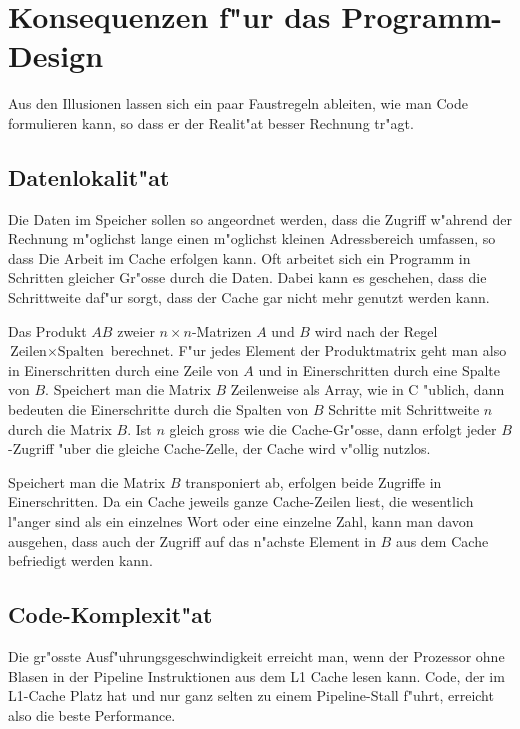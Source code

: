 \section{Konsequenzen f"ur das Programm-Design}
Aus den Illusionen lassen sich ein paar Faustregeln ableiten, wie man
Code formulieren kann, so dass er der Realit"at besser Rechnung tr"agt.

\subsection{Datenlokalit"at}
Die Daten im Speicher sollen so angeordnet werden, dass die Zugriff w"ahrend
der Rechnung m"oglichst lange einen m"oglichst kleinen Adressbereich umfassen,
so dass Die Arbeit im Cache erfolgen kann.
Oft arbeitet sich ein Programm in Schritten gleicher Gr"osse durch die
Daten.
Dabei kann es geschehen, dass die Schrittweite daf"ur sorgt, dass der
Cache gar nicht mehr genutzt werden kann.

\begin{beispiel}
Das Produkt $AB$ zweier $n\times n$-Matrizen $A$ und $B$ wird nach der Regel
$\text{Zeilen}\times \text{Spalten}$ berechnet. F"ur jedes Element
der Produktmatrix geht man also in Einerschritten durch eine Zeile
von $A$ und in Einerschritten durch eine Spalte von $B$.
Speichert man die Matrix $B$ Zeilenweise als Array, wie in C "ublich,
dann bedeuten die Einerschritte durch die Spalten von $B$ 
Schritte mit Schrittweite $n$ durch die Matrix $B$.
Ist $n$ gleich gross wie die Cache-Gr"osse, dann erfolgt jeder $B$-Zugriff
"uber die gleiche Cache-Zelle, der Cache wird v"ollig nutzlos.

Speichert man die Matrix $B$ transponiert ab, erfolgen beide Zugriffe
in Einerschritten.
Da ein Cache jeweils ganze Cache-Zeilen liest, die wesentlich l"anger 
sind als ein einzelnes Wort oder eine einzelne Zahl, kann man davon
ausgehen, dass auch der Zugriff auf das n"achste Element in $B$ 
aus dem Cache befriedigt werden kann. 

\end{beispiel}

\subsection{Code-Komplexit"at}
Die gr"osste Ausf"uhrungsgeschwindigkeit erreicht man, wenn der
Prozessor ohne Blasen in der Pipeline Instruktionen aus dem
L1 Cache lesen kann. Code, der im L1-Cache Platz hat und nur ganz
selten zu einem Pipeline-Stall f"uhrt, erreicht also die beste
Performance.

